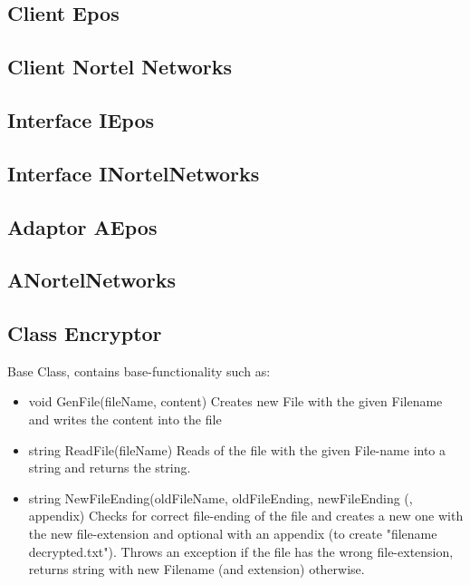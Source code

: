 \subsection{Client Epos}
\subsection{Client Nortel Networks}
\subsection{Interface IEpos}
\subsection{Interface INortelNetworks}
\subsection{Adaptor AEpos}
\subsection{ANortelNetworks}

\subsection{Class Encryptor}
Base Class, contains base-functionality such as:
\begin{itemize}
\item void GenFile(fileName, content)
\subitem Creates new File with the given Filename and writes the content into the file

\item string ReadFile(fileName)
\subitem Reads of the file with the given File-name into a string and returns the string.

\item string NewFileEnding(oldFileName, oldFileEnding, newFileEnding (, appendix)
\subitem Checks for correct file-ending of the file and creates a new one with the new file-extension and optional with an appendix (to create "filename decrypted.txt"). Throws an exception if the file has the wrong file-extension, returns string with new Filename (and extension) otherwise.

\end{itemize}
